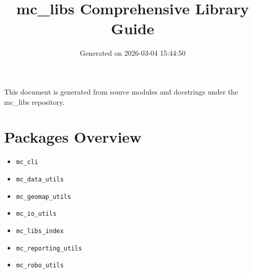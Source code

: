 \documentclass[11pt]{article}
\title{mc\_libs Comprehensive Library Guide}
\date{Generated on 2026-03-04 15:44:50}
\begin{document}
\maketitle
\tableofcontents
\newpage
This document is generated from source modules and docstrings under the mc\_libs repository.

\section{Packages Overview}
\begin{itemize}
\item \texttt{mc\_cli}
\item \texttt{mc\_data\_utils}
\item \texttt{mc\_geomap\_utils}
\item \texttt{mc\_io\_utils}
\item \texttt{mc\_libs\_index}
\item \texttt{mc\_reporting\_utils}
\item \texttt{mc\_robo\_utils}
\end{itemize}
\end{document}

